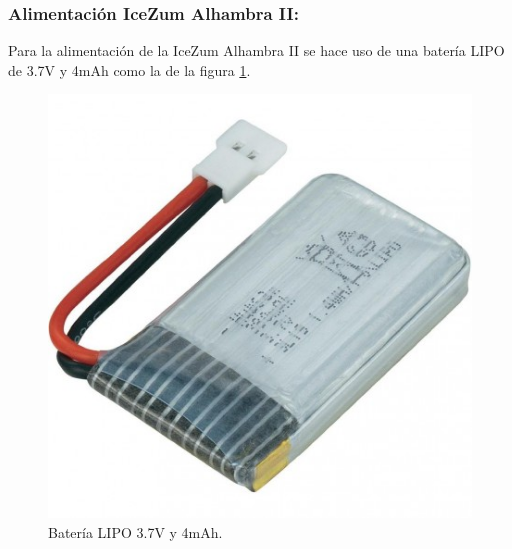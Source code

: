 \subsubsection{Alimentación IceZum Alhambra II:}

Para la alimentación de la IceZum Alhambra II se hace uso de una batería LIPO de 3.7V y 4mAh como la de la figura \ref{fig:lipo37}. 


\begin{center}
	\begin{figure}[H]
		\center
		\includegraphics[scale=0.5]{imagenes/Balancing_Robot/LIPO37}
		\caption{Batería LIPO 3.7V y 4mAh.}
		\label{fig:lipo37}
	\end{figure}
\end{center}

